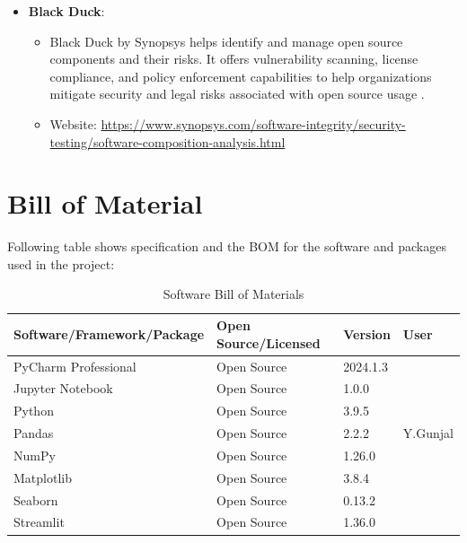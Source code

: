 \begin{itemize}
\begin{itemize}
		\item Website:
		\url{https://docs.gitlab.com/ee/user/application_security/dependency_scanning/}
	\end{itemize}
	
	\item \textbf{Black Duck}:
	\begin{itemize}
		\item Black Duck by Synopsys helps identify and manage open source components
		and their risks. It offers vulnerability scanning, license compliance,
		and policy enforcement capabilities to help organizations mitigate
		security and legal risks associated with open source usage
		\cite{BlackDuck:2024}.
		
		\item Website:
		\url{https://www.synopsys.com/software-integrity/security-testing/software-composition-analysis.html}
	\end{itemize}
\end{itemize}

\section{ Bill of Material}
Following table shows specification and the BOM for the software and packages used
in the project:
\begin{table}[H]
	\centering
	\caption{Software Bill of Materials}
	\begin{tabular}{|l|l|l|l|}
		\hline
		\textbf{Software/Framework/Package} & \textbf{Open Source/Licensed} & \textbf{Version} & \textbf{User} \\
		\hline
		PyCharm Professional                & Open Source                   & 2024.1.3         &               \\
		Jupyter Notebook                    & Open Source                   & 1.0.0            &               \\
		Python                              & Open Source                   & 3.9.5            &               \\
		Pandas                              & Open Source                   & 2.2.2            & Y.Gunjal      \\
		NumPy                               & Open Source                   & 1.26.0           &               \\
		Matplotlib                          & Open Source                   & 3.8.4            &               \\
		Seaborn                             & Open Source                   & 0.13.2           &               \\
		Streamlit                           & Open Source                   & 1.36.0           &               \\
		\hline
	\end{tabular}
\end{table}

